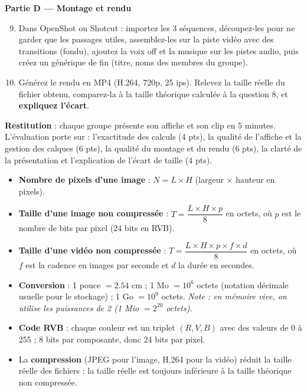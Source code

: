 \documentclass[11pt]{article}
\newcounter{popsec}
\newcounter{popsub}
\newcommand{\courssub}[1]{%
  \stepcounter{popsub}%
  \par\vspace{9pt}\noindent{\popxbold\fontsize{11.5}{13}\selectfont\color{popink}{\color{poporange}\thepopsec.\thepopsub}\hspace{6pt}#1}\par\nopagebreak\vspace{4pt}
}
\begin{document}
\textbf{Partie D — Montage et rendu}

\begin{enumerate}
  \setcounter{enumi}{8}
  \item Dans OpenShot ou Shotcut : importez les 3 séquences, découpez-les pour ne garder que les passages utiles, assemblez-les sur la piste vidéo avec des transitions (fondu), ajoutez la voix off et la musique sur les pistes audio, puis créez un générique de fin (titre, noms des membres du groupe).
  \item Générez le rendu en MP4 (H.264, 720p, 25 ips). Relevez la taille réelle du fichier obtenu, comparez-la à la taille théorique calculée à la question 8, et \textbf{expliquez l'écart}.
\end{enumerate}

\textbf{Restitution} : chaque groupe présente son affiche et son clip en 5 minutes. L'évaluation porte sur : l'exactitude des calculs (4 pts), la qualité de l'affiche et la gestion des calques (6 pts), la qualité du montage et du rendu (6 pts), la clarté de la présentation et l'explication de l'écart de taille (4 pts).

\courssub{Ressources à mobiliser}

\begin{aretenir}
\begin{itemize}
  \item \textbf{Nombre de pixels d'une image} : $N = L \times H$ (largeur $\times$ hauteur en pixels).
  \item \textbf{Taille d'une image non compressée} : $T = \dfrac{L \times H \times p}{8}$ en octets, où $p$ est le nombre de bits par pixel (24 bits en RVB).
  \item \textbf{Taille d'une vidéo non compressée} : $T = \dfrac{L \times H \times p \times f \times d}{8}$ en octets, où $f$ est la cadence en images par seconde et $d$ la durée en secondes.
  \item \textbf{Conversion} : 1 pouce $= \num{2,54}$ cm ; 1 Mo $= 10^{6}$ octets (notation décimale usuelle pour le stockage) ; 1 Go $= 10^{9}$ octets. \emph{Note : en mémoire vive, on utilise les puissances de 2 (1 Mio $= 2^{20}$ octets).}
  \item \textbf{Code RVB} : chaque couleur est un triplet $(R, V, B)$ avec des valeurs de 0 à 255 ; 8 bits par composante, donc 24 bits par pixel.
  \item La \textbf{compression} (JPEG pour l'image, H.264 pour la vidéo) réduit la taille réelle des fichiers : la taille réelle est toujours inférieure à la taille théorique non compressée.
\end{itemize}
\end{aretenir}
\end{document}
